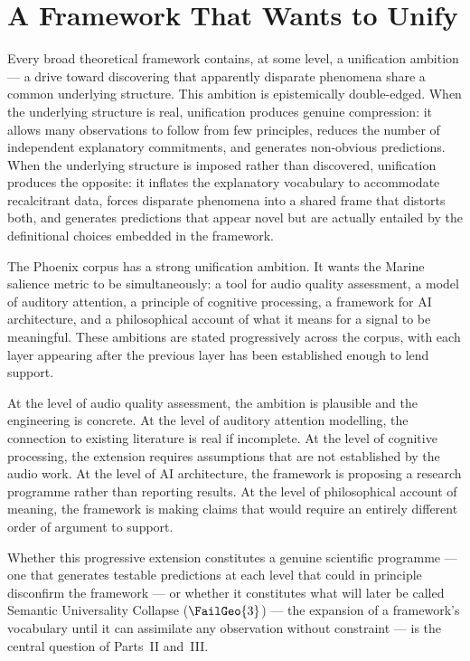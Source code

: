\section{A Framework That Wants to Unify}
\label{sec:unification-desire}

Every broad theoretical framework contains, at some level, a
unification ambition --- a drive toward discovering that apparently
disparate phenomena share a common underlying structure. This
ambition is epistemically double-edged. When the underlying structure
is real, unification produces genuine compression: it allows many
observations to follow from few principles, reduces the number of
independent explanatory commitments, and generates non-obvious
predictions. When the underlying structure is imposed rather than
discovered, unification produces the opposite: it inflates the
explanatory vocabulary to accommodate recalcitrant data, forces
disparate phenomena into a shared frame that distorts both, and
generates predictions that appear novel but are actually entailed
by the definitional choices embedded in the framework.

The Phoenix corpus has a strong unification ambition. It wants the
Marine salience metric to be simultaneously: a tool for audio quality
assessment, a model of auditory attention, a principle of cognitive
processing, a framework for AI architecture, and a philosophical
account of what it means for a signal to be meaningful. These
ambitions are stated progressively across the corpus, with each
layer appearing after the previous layer has been established enough
to lend support.

At the level of audio quality assessment, the ambition is plausible
and the engineering is concrete. At the level of auditory attention
modelling, the connection to existing literature is real if
incomplete. At the level of cognitive processing, the extension
requires assumptions that are not established by the audio work.
At the level of AI architecture, the framework is proposing a
research programme rather than reporting results. At the level of
philosophical account of meaning, the framework is making claims
that would require an entirely different order of argument to
support.

Whether this progressive extension constitutes a genuine scientific
programme --- one that generates testable predictions at each level
that could in principle disconfirm the framework --- or whether it
constitutes what will later be called Semantic Universality Collapse
($\FailGeo{3}$) --- the expansion of a framework's vocabulary until
it can assimilate any observation without constraint --- is the
central question of Parts~II and~III.

